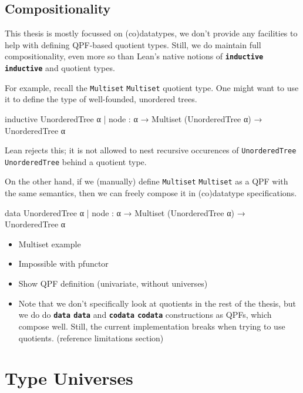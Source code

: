 \documentclass[titlepage]{report}
\newenvironment{todo}{%
\definecolor{shadecolor}{HTML}{F8E0E0}%
\begin{shaded}%
\begin{trivlist}                         
    \item[\hskip \labelsep {\bfseries Todo:}]}{\end{trivlist}\end{shaded}}
\newcommand\lean[1]{%
\ifx\leanmode\undefined%
\def\leanmode{1}%
\texttt{\small #1}%
\undef\leanmode%
\else%
\texttt{#1}%
\fi%
}
\newcommand\keyword[1]{{\color{keywordcolor} \textbf{\lean{#1}}}}
\newcommand\inductive{{\keyword{inductive}}}
\newcommand\data{\keyword{data}}
\newcommand\codata{\keyword{codata}}
\begin{document}
\subsection*{Compositionality}

This thesis is mostly focussed on (co)datatypes, we don't provide any facilities to help with defining QPF-based quotient types. 
Still, we do maintain full compositionality, even more so than Lean's native notions of \inductive{} and quotient types.

For example, recall the \lean{Multiset} quotient type. One might want to use it to define the type of well-founded, unordered trees.
\begin{badleancode}
  inductive UnorderedTree α
  | node : α → Multiset (UnorderedTree α) → UnorderedTree α
\end{badleancode}

Lean rejects this; it is not allowed to nest recursive occurences of \lean{UnorderedTree} behind a quotient type.

On the other hand, if we (manually) define \lean{Multiset} as a QPF with the same semantics, then we can freely compose it in (co)datatype specifications.
\begin{leancode}
  data UnorderedTree α
  | node : α → Multiset (UnorderedTree α) → UnorderedTree α
\end{leancode}


\begin{todo}
    \begin{itemize}
        \item Multiset example
        \item Impossible with pfunctor
        \item Show QPF definition (univariate, without universes)
        \item Note that we don't specifically look at quotients in the rest of the thesis, but we do do \data{} and \codata{} constructions as QPFs, which compose well. Still, the current implementation breaks when trying to use quotients. (reference limitations section)
    \end{itemize}
\end{todo}











\section{Type Universes}
\label{sec:bg:universes}
\end{document}
